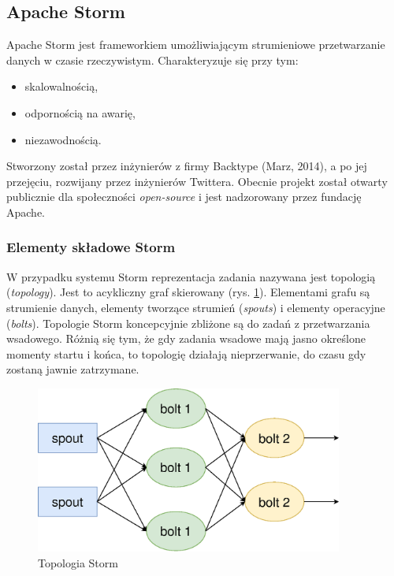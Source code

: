 \subsection{Apache Storm}
Apache Storm jest frameworkiem umożliwiającym strumieniowe przetwarzanie danych w czasie rzeczywistym.
Charakteryzuje się przy tym:
\begin{itemize}
  \item skalowalnością,
  \item odpornością na awarię,
  \item niezawodnością.
\end{itemize}
Stworzony został przez inżynierów z firmy
Backtype (Marz, 2014),
a po jej przejęciu, rozwijany przez inżynierów Twittera.
Obecnie projekt został otwarty publicznie dla społeczności \textit{open-source}
i jest nadzorowany przez fundację Apache.

\subsubsection*{Elementy składowe Storm}
\label{subs:StormElemets}
W przypadku systemu Storm reprezentacja zadania nazywana jest topologią (\textit{topology}).
Jest to acykliczny graf skierowany (rys. \ref{fig:StormTopology}).
Elementami grafu są strumienie danych,
elementy tworzące strumień (\textit{spouts})
i elementy operacyjne (\textit{bolts}).
Topologie Storm koncepcyjnie zbliżone są do zadań z przetwarzania wsadowego.
Różnią się tym,
że gdy zadania wsadowe mają jasno określone momenty startu i końca,
to topologię działają nieprzerwanie, do czasu gdy zostaną jawnie zatrzymane.
\begin{figure}[htbp]
  \centering
  \includegraphics[width=0.9\textwidth]{img/storm}
  \caption{Topologia Storm}
  \label{fig:StormTopology}
\end{figure}

